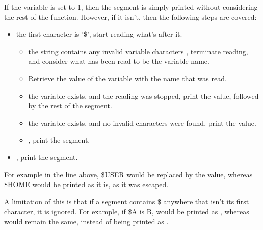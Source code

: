 \documentclass[12pt, a4paper]{report}
\begin{document}
                If the  variable is set to 1, then the segment is
                simply printed without considering the rest of the function.
                However, if it isn't, then the following steps are covered:

                \begin{itemize}
                    \item {} the first character is '\$', start reading what's after it.
                        \begin{itemize}
                            \item {} the string contains any invalid variable characters
                                ,
                                terminate reading, and consider what has been read to be
                                the variable name.
                            \item Retrieve the value of the variable with the name that
                                was read.
                            \item {} the variable exists, and the reading was stopped,
                                print the value, followed by the rest of the segment.
                            \item {} the variable exists, and no invalid characters were
                                found, print the value.
                            \item {}, print the segment.
                        \end{itemize}
                    \item {}, print the segment.
                \end{itemize}

                For example in the line above, \$USER would be replaced by the value,
                whereas \$HOME would be printed as it is, as it was escaped.

                A limitation of this is that if a segment contains \$ anywhere that isn't
                its first character, it is ignored. For example, if \$A is B, 
                would be printed as , whereas  would remain
                the same, instead of being printed as .

                \clearpage
            
        \section{}
\end{document}
